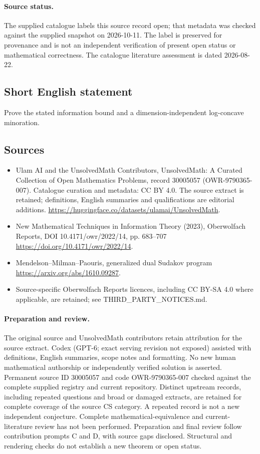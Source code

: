 \documentclass[11pt]{article}
\begin{document}
\paragraph{Source status.}
The supplied catalogue labels this source record open; that metadata was checked against the supplied snapshot on 2026-10-11. The label is preserved for provenance and is not an independent verification of present open status or mathematical correctness. The catalogue literature assessment is dated 2026-08-22.
\subsection{Short English statement}
Prove the stated information bound and a dimension-independent log-concave minoration.
\subsection{Sources}
\begin{itemize}
\item[S1] Ulam AI and the UnsolvedMath Contributors, UnsolvedMath: A Curated Collection of Open Mathematics Problems, record 30005057 (OWR-9790365-007). Catalogue curation and metadata: CC BY 4.0. The source extract is retained; definitions, English summaries and qualifications are editorial additions.
\url{https://huggingface.co/datasets/ulamai/UnsolvedMath}.
\item[S2] New Mathematical Techniques in Information Theory (2023), Oberwolfach Reports, DOI 10.4171/owr/2022/14, pp. 683--707
\url{https://doi.org/10.4171/owr/2022/14}.
\item[S3] Mendelson--Milman--Paouris, generalized dual Sudakov program
\url{https://arxiv.org/abs/1610.09287}.
\item Source-specific Oberwolfach Reports licences, including CC BY-SA 4.0 where applicable, are retained; see THIRD\_PARTY\_NOTICES.md.
\end{itemize}
\paragraph{Preparation and review.}
The original source and UnsolvedMath contributors retain attribution for the source extract. Codex (GPT-6; exact serving revision not exposed) assisted with definitions, English summaries, scope notes and formatting. No new human mathematical authorship or independently verified solution is asserted. Permanent source ID 30005057 and code OWR-9790365-007 checked against the complete supplied registry and current repository. Distinct upstream records, including repeated questions and broad or damaged extracts, are retained for complete coverage of the source CS category. A repeated record is not a new independent conjecture. Complete mathematical-equivalence and current-literature review has not been performed. Preparation and final review follow contribution prompts C and D, with source gaps disclosed. Structural and rendering checks do not establish a new theorem or open status.
\label{end:30005057}
\end{document}
